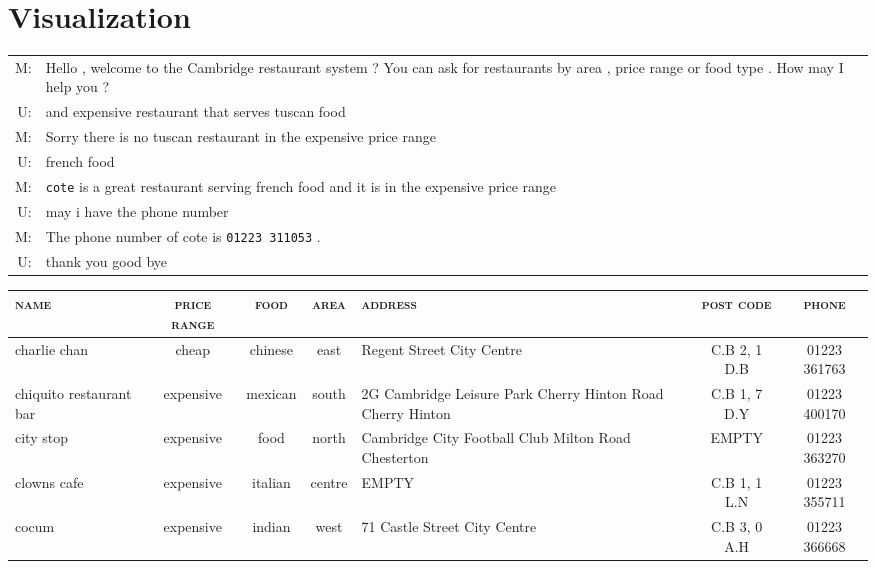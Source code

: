 \documentclass[11pt,letterpaper]{article}
\begin{document}
\section{Visualization}
\begin{table*}[!thbp]
  \centering
  \footnotesize
  \begin{subtable}{\textwidth}
    \begin{tabular}{r p{12cm}}
      M: &  Hello , welcome to the Cambridge restaurant system ? You can ask for
           restaurants by area , price range or food type . How may I help you ? \\
      U: & and expensive restaurant that serves tuscan food \\
      M: & Sorry there is no tuscan restaurant in the expensive price range \\
      U: & french food \\
      M: & \texttt{cote} is a great restaurant serving french food and it is in the
           expensive price range \\
      U: & may i have the phone number \\
      M: & The phone number of cote is \texttt{01223 311053} . \\
      U: & thank you good bye
    \end{tabular}
    \caption{Dialogue script}
  \end{subtable}
  \begin{subtable}{\textwidth}
  \begin{tabular}{| p{2cm} | c | c | c | p{3cm} | c | c |}
    \hline
    \textsc{name} & \textsc{price range} & \textsc{food} & \textsc{area} & \textsc{address} & \textsc{post code} & \textsc{phone} \\
    \hline
    charlie chan & cheap & chinese & east & Regent Street City Centre & C.B 2, 1 D.B & 01223 361763 \\
    \hline
    chiquito restaurant bar & expensive & mexican & south & 2G Cambridge Leisure Park Cherry Hinton Road Cherry Hinton & C.B 1, 7 D.Y & 01223 400170 \\
    \hline
    city stop & expensive & food & north & Cambridge City Football Club Milton Road Chesterton & EMPTY & 01223 363270 \\
    \hline
    clowns cafe & expensive & italian & centre & EMPTY & C.B 1, 1 L.N & 01223 355711\\
    \hline
    cocum & expensive & indian & west & 71 Castle Street City Centre & C.B 3, 0 A.H & 01223 366668 \\

\end{tabular}
\end{subtable}
\end{table*}
\end{document}
